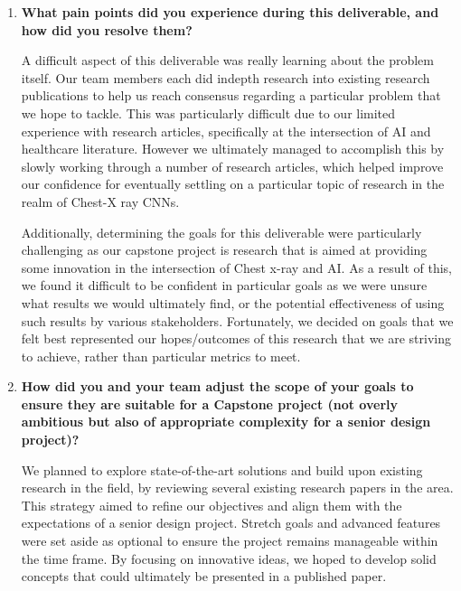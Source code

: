 \documentclass{article}
\begin{document}
\begin{enumerate}
    \item \textbf{What pain points did you experience during this deliverable, and how
    did you resolve them?}
    \begin{itemize}
    \begin{item}
        A difficult aspect of this deliverable was really learning about the problem itself. Our team members each did indepth research into existing research publications to help us reach consensus regarding a particular problem that we hope to tackle. This was particularly difficult due to our limited experience with research articles, specifically at the intersection of AI and healthcare literature. However we ultimately managed to accomplish this by slowly working through a number of research articles, which helped improve our confidence for eventually settling on a particular topic of research in the realm of Chest-X ray CNNs.
    \end{item}
    \begin{item}
        Additionally, determining the goals for this deliverable were particularly challenging as our capstone project is research that is aimed at providing some innovation in the intersection of Chest x-ray and AI. As a result of this, we found it difficult to be confident in particular goals as we were unsure what results we would ultimately find, or the potential effectiveness of using such results by various stakeholders. Fortunately, we decided on goals that we felt best represented our hopes/outcomes of this research that we are striving to achieve, rather than particular metrics to meet.
    \end{item}
    \end{itemize}
    \item \textbf{How did you and your team adjust the scope of your goals to ensure
    they are suitable for a Capstone project (not overly ambitious but also of
    appropriate complexity for a senior design project)?}

    We planned to explore state-of-the-art solutions and build upon existing research in the field, by reviewing several existing research papers in the area. This strategy aimed to refine our objectives and align them with the expectations of a senior design project. Stretch goals and advanced features were set aside as optional to ensure the project remains manageable within the time frame. By focusing on innovative ideas, we hoped to develop solid concepts that could ultimately be presented in a published paper.


\end{enumerate}
\end{document}
